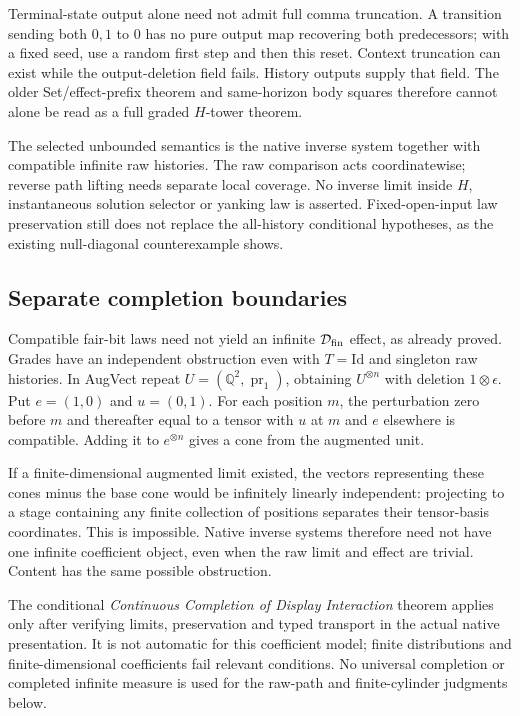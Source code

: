 \documentclass[11pt]{article}
\begin{document}
Terminal-state output alone need not admit full comma truncation. A transition sending both $0,1$ to $0$ has no pure output map recovering both predecessors; with a fixed seed, use a random first step and then this reset. Context truncation can exist while the output-deletion field fails. History outputs supply that field. The older Set/effect-prefix theorem and same-horizon body squares therefore cannot alone be read as a full graded $H$-tower theorem.

The selected unbounded semantics is the native inverse system together with compatible infinite raw histories. The raw comparison acts coordinatewise; reverse path lifting needs separate local coverage. No inverse limit inside $H$, instantaneous solution selector or yanking law is asserted. Fixed-open-input law preservation still does not replace the all-history conditional hypotheses, as the existing null-diagonal counterexample shows.

\subsection{Separate completion boundaries}

Compatible fair-bit laws need not yield an infinite $\mathcal D_{\rm fin}$ effect, as already proved. Grades have an independent obstruction even with $T=\mathrm{Id}$ and singleton raw histories. In AugVect repeat $U=(\mathbb Q^2,\operatorname{pr}_1)$, obtaining $U^{\otimes n}$ with deletion $1\otimes\epsilon$. Put $e=(1,0)$ and $u=(0,1)$. For each position $m$, the perturbation zero before $m$ and thereafter equal to a tensor with $u$ at $m$ and $e$ elsewhere is compatible. Adding it to $e^{\otimes n}$ gives a cone from the augmented unit.

If a finite-dimensional augmented limit existed, the vectors representing these cones minus the base cone would be infinitely linearly independent: projecting to a stage containing any finite collection of positions separates their tensor-basis coordinates. This is impossible. Native inverse systems therefore need not have one infinite coefficient object, even when the raw limit and effect are trivial. Content has the same possible obstruction.

The conditional \emph{Continuous Completion of Display Interaction} theorem applies only after verifying limits, preservation and typed transport in the actual native presentation. It is not automatic for this coefficient model; finite distributions and finite-dimensional coefficients fail relevant conditions. No universal completion or completed infinite measure is used for the raw-path and finite-cylinder judgments below.
\end{document}
